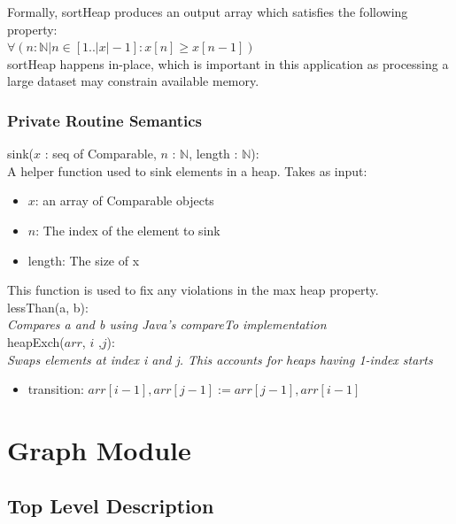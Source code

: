 \documentclass[12pt]{article}
\begin{document}
\noindent
Formally, sortHeap produces an output array which satisfies the following property:\\

$\forall (n : \mathbb{N} | n \in [1..|x|-1] : x[n] \geq x[n-1])$\\

\noindent
sortHeap happens in-place, which is important in this application as processing a large
dataset may constrain available memory.

\subsubsection* {Private Routine Semantics}

sink($x$ : seq of Comparable, $n$ : $\mathbb{N}$, length : $\mathbb{N}$):\\
A helper function used to sink elements in a heap. Takes as input:
\begin{itemize}
\item $x$: an array of Comparable objects
\item $n$: The index of the element to sink
\item length: The size of x
\end{itemize}
This function is used to fix any violations in the max heap property.\\

\noindent
lessThan(a, b):\\
\textit{Compares a and b using Java's compareTo implementation}\\

\noindent
heapExch($arr$, $i$ ,$j$):\\
\textit{Swaps elements at index i and j. This accounts for heaps having 1-index starts}
\begin{itemize}
\item transition: $arr[i-1], arr[j-1] := arr[j-1], arr[i-1]$
\end{itemize}

\newpage


\section*{Graph Module}

\subsection* {Top Level Description}
\end{document}
